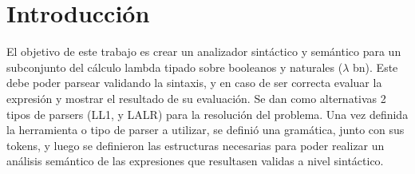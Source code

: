 \section{Introducción}

El objetivo de este trabajo es crear un analizador sintáctico y semántico para un subconjunto del cálculo lambda tipado
sobre booleanos y naturales ($\lambda$ bn). Este debe poder parsear validando la sintaxis, y en caso de ser correcta evaluar 
la expresión y mostrar el resultado de su evaluación. Se dan como alternativas 2 tipos de parsers (LL1, y LALR) para la resolución 
del problema. Una vez definida la herramienta o tipo de parser a utilizar, se definió una gramática, junto con sus tokens, y luego 
se definieron las estructuras necesarias para poder realizar un análisis semántico de las expresiones que resultasen validas a nivel 
sintáctico.
